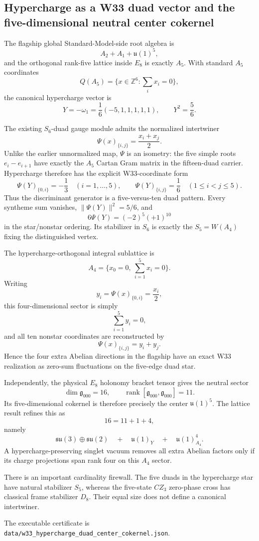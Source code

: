 \subsection{Hypercharge as a W33 duad vector and the five-dimensional neutral center cokernel}
\label{sec:20260920-hypercharge-duad-center-cokernel}

The flagship global Standard-Model-side root algebra is
\[
A_2+A_1+\mathfrak u(1)^5,
\]
and the orthogonal rank-five lattice inside \(E_8\) is exactly \(A_5\).
With standard \(A_5\) coordinates
\[
Q(A_5)=\{x\in\mathbb Z^6:\sum_i x_i=0\},
\]
the canonical hypercharge vector is
\[
Y=-\omega_1=\frac16(-5,1,1,1,1,1),
\qquad
Y^2=\frac56.
\]

The existing \(S_6\)-duad gauge module admits the normalized intertwiner
\[
\Psi(x)_{\{i,j\}}=\frac{x_i+x_j}{2}.
\]
Unlike the earlier unnormalized map, \(\Psi\) is an isometry: the five simple
roots \(e_i-e_{i+1}\) have exactly the \(A_5\) Cartan Gram matrix in the
fifteen-duad carrier.  Hypercharge therefore has the explicit W33-coordinate
form
\[
\Psi(Y)_{\{0,i\}}=-\frac13\quad(i=1,\ldots,5),
\qquad
\Psi(Y)_{\{i,j\}}=\frac16\quad(1\le i<j\le5).
\]
Thus the discriminant generator is a five-versus-ten duad pattern.  Every
syntheme sum vanishes, \(\|\Psi(Y)\|^2=5/6\), and
\[
6\Psi(Y)=(-2)^5(+1)^{10}
\]
in the star/nonstar ordering.  Its stabilizer in \(S_6\) is exactly the
\(S_5=W(A_4)\) fixing the distinguished vertex.

The hypercharge-orthogonal integral sublattice is
\[
A_4=\{x_0=0,\ \sum_{i=1}^{5}x_i=0\}.
\]
Writing
\[
y_i=\Psi(x)_{\{0,i\}}=\frac{x_i}{2},
\]
this four-dimensional sector is simply
\[
\sum_{i=1}^{5}y_i=0,
\]
and all ten nonstar coordinates are reconstructed by
\[
\Psi(x)_{\{i,j\}}=y_i+y_j.
\]
Hence the four extra Abelian directions in the flagship have an exact W33
realization as zero-sum fluctuations on the five-edge duad star.

Independently, the physical \(E_8\) holonomy bracket tensor gives the neutral
sector
\[
\dim\mathfrak g_{000}=16,
\qquad
\operatorname{rank}[\mathfrak g_{000},\mathfrak g_{000}]=11.
\]
Its five-dimensional cokernel is therefore precisely the center
\(\mathfrak u(1)^5\).  The lattice result refines this as
\[
16=11+1+4,
\]
namely
\[
\mathfrak{su}(3)\oplus\mathfrak{su}(2)
\quad+\quad
\mathfrak u(1)_Y
\quad+\quad
\mathfrak u(1)^4_{A_4}.
\]
A hypercharge-preserving singlet vacuum removes all extra Abelian factors only
if its charge projections span rank four on this \(A_4\) sector.

There is an important cardinality firewall.  The five duads in the
hypercharge star have natural stabilizer \(S_5\), whereas the five-state
\(CZ_3\) zero-phase cross has classical frame stabilizer \(D_8\).  Their equal
size does not define a canonical intertwiner.

The executable certificate is
\texttt{data/w33\_hypercharge\_duad\_center\_cokernel.json}.

